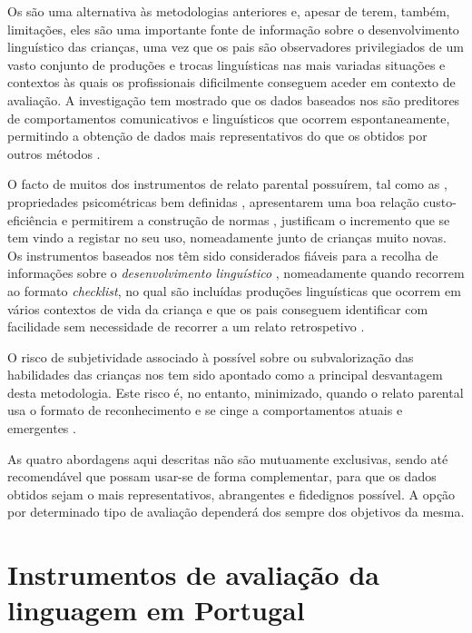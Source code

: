 \documentclass[output=paper]{LSP/langsci}
\begin{document}
Os  são uma alternativa às metodologias anteriores e, apesar de terem, também, limitações, eles são uma importante fonte de informação sobre o desenvolvimento linguístico das crianças, uma vez que os pais são observadores privilegiados de um vasto conjunto de produções e trocas linguísticas nas mais variadas situações e contextos às quais os profissionais dificilmente conseguem aceder em contexto de avaliação. A investigação tem mostrado que os dados baseados nos  são preditores de comportamentos comunicativos e linguísticos que ocorrem espontaneamente, permitindo a obtenção de dados mais representativos do que os obtidos por outros métodos \citep{fenson_etal2007}. 

O facto de muitos dos instrumentos de relato parental possuírem, tal como as , propriedades psicométricas bem definidas \citep{paul2007}, apresentarem uma boa relação custo-eficiência e permitirem a construção de normas \citep{fenson_etal2007,simonsen2014norwegian}, justificam o incremento que se tem vindo a registar no seu uso, nomeadamente junto de crianças muito novas. Os instrumentos baseados nos  têm sido considerados fiáveis para a recolha de informações sobre o \textit{desenvolvimento linguístico} \citep{feldman_etal2000,fenson_etal2007,jacksonmaldonado1993,thal2000}, nomeadamente quando recorrem ao formato \textit{checklist}, no qual são incluídas produções linguísticas que ocorrem em vários contextos de vida da criança e que os pais conseguem identificar com facilidade sem necessidade de recorrer a um relato retrospetivo \citep{bates1993}. 

O risco de subjetividade associado à possível sobre ou subvalorização das habilidades das crianças nos  tem sido apontado como a principal desvantagem desta metodologia. Este risco é, no entanto, minimizado, quando o relato parental usa o formato de reconhecimento e se cinge a comportamentos atuais e emergentes \citep{fenson_etal2007}.

As quatro abordagens aqui descritas não são mutuamente exclusivas, sendo até recomendável que possam usar-se de forma complementar, para que os dados obtidos sejam o mais representativos, abrangentes e fidedignos possível. A opção por determinado tipo de avaliação dependerá dos sempre dos objetivos da mesma. 

\section{Instrumentos de avaliação da linguagem em Portugal}
\label{sec:viana_instrumentos_portugal}
\end{document}
